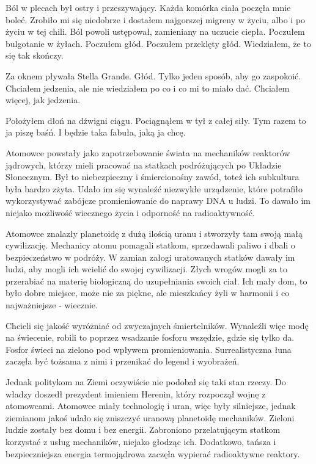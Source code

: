 Ból w plecach był ostry i przeszywający.
Każda komórka ciała poczęła mnie boleć.
Zrobiło mi się niedobrze i dostałem najgorszej migreny w życiu, albo i po życiu w tej chili.
Ból powoli ustępował, zamieniany na uczucie ciepła.
Poczułem bulgotanie w żyłach.
Poczułem głód.
Poczułem przeklęty głód.
Wiedziałem, że to się tak skończy.

Za oknem pływała Stella Grande. Głód. Tylko jeden sposób, aby go zaspokoić.
Chciałem jedzenia, ale nie wiedziałem po co i co mi to miało dać.
Chciałem więcej, jak jedzenia.

Położyłem dłoń na dźwigni ciągu.
Pociągnąłem w tył z całej siły.
Tym razem to ja piszę baśń.
I będzie taka fabuła, jaką ja chcę.

\bigskip
{}
Atomowce powstały jako zapotrzebowanie świata na mechaników reaktorów jądrowych, którzy mieli pracować na statkach podróżujących po Układzie Słonecznym. 
Był to niebezpieczny i śmiercionośny zawód, toteż ich subkultura była bardzo zżyta.
Udało im się wynaleźć niezwykłe urządzenie, które potrafiło wykorzystywać zabójcze promieniowanie do naprawy DNA u ludzi. 
To dawało im niejako możliwość wiecznego życia i odporność na radioaktywność.

Atomowce znalazły planetoidę z dużą ilością uranu i stworzyły tam swoją małą cywilizację. 
Mechanicy atomu pomagali statkom, sprzedawali paliwo i dbali o bezpieczeństwo w podróży.
W zamian załogi uratowanych statków dawały im ludzi, aby mogli ich wcielić do swojej cywilizacji. 
Złych wrogów mogli za to przerabiać na materię biologiczną do uzupełniania swoich ciał. 
Ich mały dom, to było dobre miejsce, może nie za piękne, ale mieszkańcy żyli w harmonii i co najważniejsze - wiecznie. 

Chcieli się jakość wyróżniać od zwyczajnych śmiertelników.
Wynaleźli więc modę na świecenie, robili to poprzez wsadzanie fosforu wszędzie, gdzie się tylko da. 
Fosfor świeci na zielono pod wpływem promieniowania.
Surrealistyczna łuna zaczęła być tożsama z nimi i przenikać do legend i wyobrażeń.

Jednak politykom na Ziemi oczywiście nie podobał się taki stan rzeczy. 
Do władzy doszedł prezydent imieniem Herenin, który rozpoczął wojnę z atomowcami. 
Atomowce miały technologię i uran, więc były silniejsze, jednak ziemianom jakoś udało się zniszczyć uranową planetoidę mechaników. 
Zieloni ludzie zostały bez domu i bez energii. 
Zabroniono przelatującym statkom korzystać z usług mechaników, niejako głodząc ich.
Dodatkowo, tańsza i bezpieczniejsza energia termojądrowa zaczęła wypierać radioaktywne reaktory.

